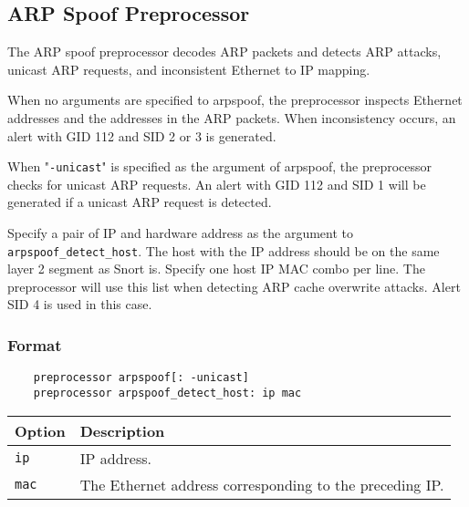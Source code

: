 \documentclass[english]{report}
\begin{document}
\subsection{ARP Spoof Preprocessor}
\label{sub:arpspoof}

The ARP spoof preprocessor decodes ARP packets and detects ARP attacks, unicast
ARP requests, and inconsistent Ethernet to IP mapping.

When no arguments are specified to arpspoof, the preprocessor inspects Ethernet
addresses and the addresses in the ARP packets. When inconsistency occurs, an
alert with GID 112 and SID 2 or 3 is generated.

When "\texttt{-unicast}" is specified as the argument of arpspoof, the
preprocessor checks for unicast ARP requests. An alert with GID 112 and SID 1
will be generated if a unicast ARP request is detected.

Specify a pair of IP and hardware address as the argument to
\texttt{arpspoof\_detect\_host}.  The host with the IP address should be on the
same layer 2 segment as Snort is.  Specify one host IP MAC combo per line. The
preprocessor will use this list when detecting ARP cache overwrite attacks.
Alert SID 4 is used in this case.

\subsubsection{Format}

\begin{verbatim}
    preprocessor arpspoof[: -unicast]
    preprocessor arpspoof_detect_host: ip mac                   
\end{verbatim}

\begin{table}[h]
\begin{center}
\begin{tabular}{| l | l |}

\hline 
\textbf{Option} & \textbf{Description}\\
\hline

\hline
\texttt{ip} & IP address.\\

\hline 
\texttt{mac} & The Ethernet address corresponding to the preceding IP. \\
\hline

\end{tabular}
\end{center}
\end{table}
\end{document}
